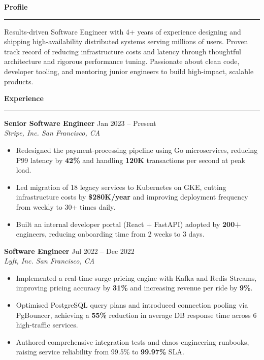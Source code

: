 \documentclass[10pt]{article}
\newlength{\sbw}\setlength{\sbw}{72mm}
\newcommand{\mainheading}[1]{%
  \vspace{4mm}%
  {\bfseries\large\color{accent} #1}\\[-1mm]%
  {\color{accent}\rule{\dimexpr\paperwidth-\sbw-14mm\relax}{0.6pt}}%
  \vspace{1mm}%
}
\newcommand{\expentry}[3]{%
  \vspace{1.5mm}%
  \noindent\parbox[t]{\dimexpr\paperwidth-\sbw-14mm\relax}{%
    {\bfseries\color{maingray} #1}\hfill{\small\color{accent} #3}\\%
    {\small\itshape\color{maingray} #2}%
  }%
  \vspace{0.5mm}%
}
\begin{document}
\begin{minipage}[t]{\dimexpr\paperwidth-\sbw\relax}
  \vspace{10mm}\hspace{6mm}%
  \begin{minipage}[t]{\dimexpr\paperwidth-\sbw-14mm\relax}

    \mainheading{Profile}
    \small\color{maingray}
    Results-driven Software Engineer with 4+ years of experience designing and shipping
    high-availability distributed systems serving millions of users. Proven track record of
    reducing infrastructure costs and latency through thoughtful architecture and rigorous
    performance tuning. Passionate about clean code, developer tooling, and mentoring junior
    engineers to build high-impact, scalable products.

    \mainheading{Experience}

    \expentry{Senior Software Engineer}{Stripe, Inc. \textbar{} San Francisco, CA}{Jan 2023 -- Present}
    \begin{itemize}[leftmargin=*,itemsep=0pt,topsep=2pt,parsep=0pt]
      \small\color{maingray}
      \item Redesigned the payment-processing pipeline using Go microservices, reducing P99 latency by \textbf{42\%} and handling \textbf{120K} transactions per second at peak load.
      \item Led migration of 18 legacy services to Kubernetes on GKE, cutting infrastructure costs by \textbf{\$280K/year} and improving deployment frequency from weekly to 30+ times daily.
      \item Built an internal developer portal (React + FastAPI) adopted by \textbf{200+} engineers, reducing onboarding time from 2 weeks to 3 days.
    \end{itemize}

    \expentry{Software Engineer}{Lyft, Inc. \textbar{} San Francisco, CA}{Jul 2022 -- Dec 2022}
    \begin{itemize}[leftmargin=*,itemsep=0pt,topsep=2pt,parsep=0pt]
      \small\color{maingray}
      \item Implemented a real-time surge-pricing engine with Kafka and Redis Streams, improving pricing accuracy by \textbf{31\%} and increasing revenue per ride by \textbf{9\%}.
      \item Optimised PostgreSQL query plans and introduced connection pooling via PgBouncer, achieving a \textbf{55\%} reduction in average DB response time across 6 high-traffic services.
      \item Authored comprehensive integration tests and chaos-engineering runbooks, raising service reliability from 99.5\% to \textbf{99.97\%} SLA.
    \end{itemize}


\end{minipage}
\end{minipage}
\end{document}
